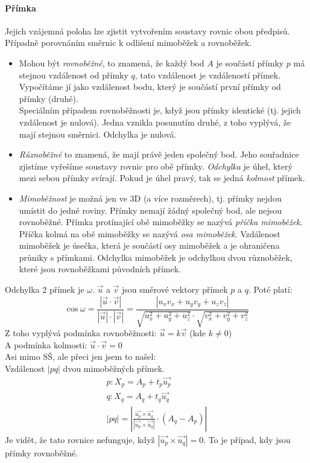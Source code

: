 \documentclass[12pt]{article}
\begin{document}
\paragraph{Přímka} Jejich vzájemná poloha lze zjistit vytvořením soustavy rovnic obou předpisů. Případně porovnáním směrnic k odlišení mimoběžek a rovnoběžek.
\begin{itemize}
\item  Mohou být \emph{rovnoběžné}, to znamená, že každý bod $A$ je součástí přímky $p$ má stejnou vzdálenost od přímky $q$, tato vzdálenost je vzdáleností přímek. Vypočítáme jí jako vzdálenost bodu, který je součástí první přímky od přímky (druhé).\\
Speciálním případem rovnoběžnosti je, když jsou přímky identické (tj. jejich vzdálenost je nulová). Jedna vznikla posunutím druhé, z toho vyplývá, že mají stejnou směrnici. Odchylka je nulová.
\item \emph{Různoběžné} to znamená, že mají právě jeden společný bod. Jeho souřadnice zjistíme vyřešíme soustavy rovnic pro obě přímky. \emph{Odchylka} je úhel, který mezi sebou přímky svírají. Pokud je úhel pravý, tak se jedná \emph{kolmost} přímek.
\item \emph{Mimoběžnost} je možná jen ve  3D (a více rozměrech), tj. přímky nejdou umístit do jedné roviny. Přímky nemají žádný společný bod, ale nejsou rovnoběžné. Přímka protínající obě mimoběžky se nazývá \emph{příčka mimoběžek}.\\
Příčka kolmá na obě mimoběžky se nazývá \emph{osa mimoběžek}. Vzdálenost mimoběžek je úsečka, která je součástí osy mimoběžek a je ohraničena průniky s přímkami. Odchylka mimoběžek je odchylkou dvou různoběžek, které jsou rovnoběžkami původních přímek.
\end{itemize}
Odchylka 2 přímek je $\omega$. $\vec{u}$ a $\vec{v}$ jsou směrové vektory přímek $p$ a $q$. Poté platí:
\begin{equation}
\cos\omega= \frac{|\vec{u}\cdot\vec{v}|}{|\vec{u}|\cdot |\vec{v}|} = \frac{|u_x v_x + u_y v_y + u_z v_z|}{\sqrt{u_x^2 + u_y^2 + u_z^2} \cdot \sqrt{v_x^2 + v_y^2 + v_z^2}}
\end{equation}
Z toho vyplývá podmínka rovnoběžnosti: $\vec{u} = k \vec{v}$ (kde $k \neq 0$)\\
A podmínka kolmosti: $\vec{u} \cdot \vec{v} = 0$\\
Asi mimo SŠ, ale přeci jen jsem to našel:\\
Vzdálenost $|pq|$ dvou mimoběžných přímek.
\begin{align}
p: X_p = A_p + t_p \vec{u_p}\\
q: X_q = A_q + t_q \vec{u_q}\\
|pq| = \left| \frac{\vec{u_p} \times \vec{u_q}}{| \vec{u_p} \times \vec{u_q}|} \cdot (A_q - A_p) \right|
\end{align}
Je vidět, že tato rovnice nefunguje, když $| \vec{u_p} \times \vec{u_q}| = 0$. To je případ, kdy jsou přímky rovnoběžné.
\end{document}
